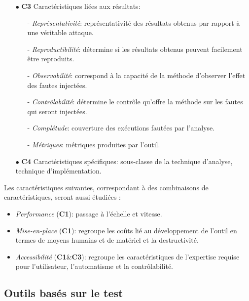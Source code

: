 \begin{itemize}
                \item[$\bullet$]\textbf{C3} Caractéristiques liées aux résultats:
                \begin{itemize}
                    \item[-] \textit{Représentativité}: représentativité des résultats obtenus par rapport à une véritable attaque. 
                    \item[-] \textit{Reproductibilité}: détermine si les résultats obtenus peuvent facilement être reproduits. 
                    \item[-] \textit{Observabilité}: correspond à la capacité de la méthode d'observer l'effet des fautes injectées. 
                    \item[-] \textit{Contrôlabilité}: détermine le contrôle qu'offre la méthode sur les fautes qui seront injectées.
                    \item[-] \textit{Complétude}: couverture des exécutions fautées par l'analyse.
                    \item[-] \textit{Métriques}: métriques produites par l'outil.
                \end{itemize}
                
                \item[$\bullet$]\textbf{C4} Caractéristiques spécifiques: sous-classe de la technique d'analyse, technique d'implémentation.
            \end{itemize}
            
            Les caractéristiques suivantes, correspondant à des combinaisons de caractéristiques, seront aussi étudiées :
            \begin{itemize}
                \item \textit{Performance} (\textbf{C1}): passage à l'échelle et vitesse.
                \item \textit{Mise-en-place} (\textbf{C1}): regroupe les coûts lié au développement de l'outil en termes de moyens humains et de matériel et la destructivité.
                \item \textit{Accessibilité} (\textbf{C1}\&\textbf{C3}): regroupe les caractéristiques de l'expertise requise pour l'utilisateur, l'automatisme et la contrôlabilité.
            \end{itemize}
            
        \subsection{Outils basés sur le test}
        \label{sec:soa-tools-test}
        
